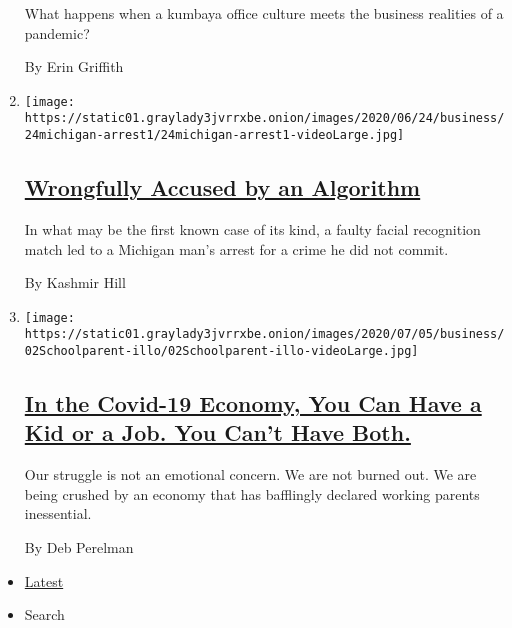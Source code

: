 \begin{enumerate}
  What happens when a kumbaya office culture meets the business
  realities of a pandemic?

  By Erin Griffith
\item
  \texttt{[image: https://static01.graylady3jvrrxbe.onion/images/2020/06/24/business/24michigan-arrest1/24michigan-arrest1-videoLarge.jpg]}

  \hypertarget{wrongfully-accused-by-an-algorithm}{%
  \subsection{\texorpdfstring{\href{/2020/06/24/technology/facial-recognition-arrest.html}{Wrongfully
  Accused by an
  Algorithm}}{Wrongfully Accused by an Algorithm}}\label{wrongfully-accused-by-an-algorithm}}

  In what may be the first known case of its kind, a faulty facial
  recognition match led to a Michigan man's arrest for a crime he did
  not commit.

  By Kashmir Hill
\item
  \texttt{[image: https://static01.graylady3jvrrxbe.onion/images/2020/07/05/business/02Schoolparent-illo/02Schoolparent-illo-videoLarge.jpg]}

  \hypertarget{in-the-covid-19-economy-you-can-have-a-kid-or-a-job-you-cant-have-both}{%
  \subsection{\texorpdfstring{\href{/2020/07/02/business/covid-economy-parents-kids-career-homeschooling.html}{In
  the Covid-19 Economy, You Can Have a Kid or a Job. You Can't Have
  Both.}}{In the Covid-19 Economy, You Can Have a Kid or a Job. You Can't Have Both.}}\label{in-the-covid-19-economy-you-can-have-a-kid-or-a-job-you-cant-have-both}}

  Our struggle is not an emotional concern. We are not burned out. We
  are being crushed by an economy that has bafflingly declared working
  parents inessential.

  By Deb Perelman
\end{enumerate}

\begin{itemize}
\tightlist
\item
  \protect\hyperlink{stream-panel}{Latest}
\item
  Search
\end{itemize}


